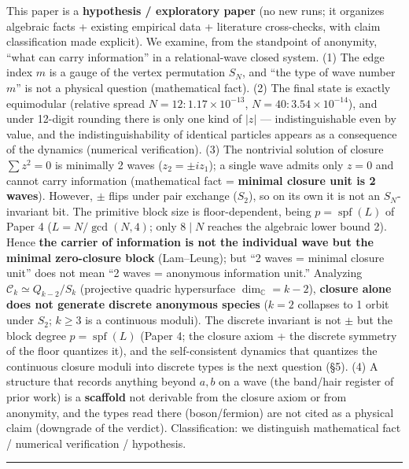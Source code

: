\documentclass[
  a4paper,
]{ltjsarticle}
\begin{document}
This paper is a \textbf{hypothesis / exploratory paper} (no new runs; it
organizes algebraic facts + existing empirical data + literature
cross-checks, with claim classification made explicit). We examine, from
the standpoint of anonymity, ``what can carry information'' in a
relational-wave closed system. (1) The edge index \(m\) is a gauge of
the vertex permutation \(S_N\), and ``the type of wave number \(m\)'' is
not a physical question (mathematical fact). (2) The final state is
exactly equimodular (relative spread \(N=12{:}1.17\times10^{-13}\),
\(N=40{:}3.54\times10^{-14}\)), and under 12-digit rounding there is
only one kind of \(|z|\) --- indistinguishable even by value, and the
indistinguishability of identical particles appears as a consequence of
the dynamics (numerical verification). (3) The nontrivial solution of
closure \(\sum z^2=0\) is minimally 2 waves (\(z_2=\pm i z_1\)); a
single wave admits only \(z=0\) and cannot carry information
(mathematical fact = \textbf{minimal closure unit is 2 waves}). However,
\(\pm\) flips under pair exchange (\(S_2\)), so on its own it is not an
\(S_N\)-invariant bit. The primitive block size is floor-dependent,
being \(p=\operatorname{spf}(L)\) of Paper 4 (\(L=N/\gcd(N,4)\); only
\(8\mid N\) reaches the algebraic lower bound 2). Hence \textbf{the
carrier of information is not the individual wave but the minimal
zero-closure block} (Lam--Leung); but ``2 waves = minimal closure unit''
does not mean ``2 waves = anonymous information unit.'' Analyzing
\(\mathcal C_k\simeq Q_{k-2}/S_k\) (projective quadric hypersurface
\(\dim_{\mathbb C}=k-2\)), \textbf{closure alone does not generate
discrete anonymous species} (\(k=2\) collapses to 1 orbit under \(S_2\);
\(k\ge3\) is a continuous moduli). The discrete invariant is not \(\pm\)
but the block degree \(p=\operatorname{spf}(L)\) (Paper 4; the closure
axiom + the discrete symmetry of the floor quantizes it), and the
self-consistent dynamics that quantizes the continuous closure moduli
into discrete types is the next question (§5). (4) A structure that
records anything beyond \(a,b\) on a wave (the band/hair register of
prior work) is a \textbf{scaffold} not derivable from the closure axiom
or from anonymity, and the types read there (boson/fermion) are not
cited as a physical claim (downgrade of the verdict). Classification: we
distinguish mathematical fact / numerical verification / hypothesis.

\begin{center}\rule{0.5\linewidth}{0.5pt}\end{center}
\end{document}
